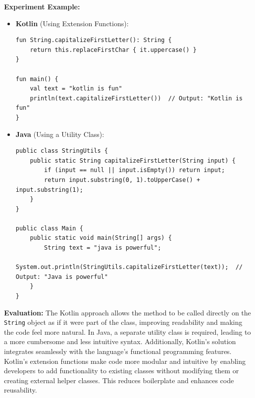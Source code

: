 \vspace{1em}

\noindent \textbf{Experiment Example:}  
\begin{tcolorbox}[colframe=blue!80!black, colback=blue!5!white, coltitle=blue!50!black, title={-}]
    \begin{itemize}
        \item \textbf{Kotlin} (Using Extension Functions):
        \begin{lstlisting}[style=kotlin]
fun String.capitalizeFirstLetter(): String {
    return this.replaceFirstChar { it.uppercase() }
}

fun main() {
    val text = "kotlin is fun"
    println(text.capitalizeFirstLetter())  // Output: "Kotlin is fun"
}
        \end{lstlisting}
        
        \item \textbf{Java} (Using a Utility Class):
        \begin{lstlisting}[style=java]
public class StringUtils {
    public static String capitalizeFirstLetter(String input) {
        if (input == null || input.isEmpty()) return input;
        return input.substring(0, 1).toUpperCase() + input.substring(1);
    }
}

public class Main {
    public static void main(String[] args) {
        String text = "java is powerful";
        System.out.println(StringUtils.capitalizeFirstLetter(text));  // Output: "Java is powerful"
    }
}
        \end{lstlisting}
    \end{itemize}
\end{tcolorbox}

\vspace{1em}

\noindent \textbf{Evaluation:}  
The Kotlin approach allows the method to be called directly on the \texttt{String} object as if it were part of the class, improving readability and making the code feel more natural. In Java, a separate utility class is required, leading to a more cumbersome and less intuitive syntax. Additionally, Kotlin’s solution integrates seamlessly with the language’s functional programming features. Kotlin's extension functions make code more modular and intuitive by enabling developers to add functionality to existing classes without modifying them or creating external helper classes. This reduces boilerplate and enhances code reusability.

\vspace{1em}

